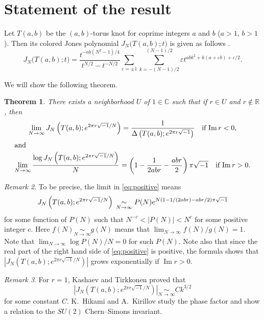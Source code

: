 \documentclass[a4paper,draft]{amsart}
\theoremstyle{plain}
\newtheorem{thm}{Theorem}[section]
\theoremstyle{definition}
\theoremstyle{remark}
\newtheorem{rem}[thm]{Remark}
\newcommand{\C}{\mathbb{C}}
\newcommand{\R}{\mathbb{R}}
\renewcommand{\Im}{\operatorname{Im}}
\numberwithin{equation}{section}
\begin{document}
\section{Statement of the result}
Let $T(a,b)$ be the $(a,b)$-torus knot for coprime integers $a$ and $b$
($a>1$, $b>1$).
Then its colored Jones polynomial $J_N\bigl(T(a,b);t\bigr)$ is given as follows
\cite{Morton:MATPC95}.
\begin{equation*}
  J_N\bigl(T(a,b);t\bigr)
  =
  \frac{t^{-ab(N^2-1)/4}}{t^{N/2}-t^{-N/2}}
  \sum_{\varepsilon=\pm1}
  \sum_{k=-(N-1)/2}^{(N-1)/2}
  \varepsilon
  t^{abk^2+k(a+\varepsilon{b})+\varepsilon/2}.
\end{equation*}
\par
We will show the following theorem.
\begin{thm}\label{thm}
There exists a neighborhood $U$ of $1\in\C$ such that
if $r\in{U}$ and $r\notin\R$, then
\begin{gather}
  \lim_{N\to\infty}J_N\left(T(a,b);e^{2\pi{r}\sqrt{-1}/N}\right)
  =
  \frac{1}{\Delta\left(T(a,b);e^{2\pi{r}\sqrt{-1}}\right)}
  \quad\text{if $\Im{r}<0$},
  \label{eq:negative}
  \\
  \intertext{and}
  \lim_{N\to\infty}
  \frac{\log{J_N\left(T(a,b);e^{2\pi{r}\sqrt{-1}/N}\right)}}{N}
  =
  \left(1-\dfrac{1}{2abr}-\dfrac{abr}{2}\right)\pi\sqrt{-1}
  \quad\text{if $\Im{r}>0$}.
  \label{eq:positive}
\end{gather}
\end{thm}
\begin{rem}
To be precise, the limit in \eqref{eq:positive} means
\begin{equation*}
  J_N\left(T(a,b);e^{2\pi{r}\sqrt{-1}/N}\right)
  \\
  \underset{N\to\infty}{\sim}
  P(N)e^{N(1-1/(2abr)-abr/2)\pi\sqrt{-1}}
\end{equation*}
for some function of $P(N)$ such that $N^{-c}<|P(N)|<N^c$ for some
positive integer $c$.
Here $f(N)\underset{N\to\infty}{\sim}g(N)$ means that
$\lim_{N\to\infty}f(N)/g(N)=1$.
Note that $\lim_{N\to\infty}\log{P(N)}/N=0$ for such $P(N)$.
Note also that since the real part of the right hand side of \eqref{eq:positive}
is positive, the formula shows that
$\left|J_N\left(T(a,b);e^{2\pi{r}\sqrt{-1}/N}\right)\right|$
grows exponentially if $\Im{r}>0$.
\end{rem}
\begin{rem}
For $r=1$,
Kashaev and Tirkkonen \cite{Kashaev/Tirkkonen:ZAPNS200} proved that
\begin{equation*}
  \left|J_N\left(T(a,b);e^{2\pi{r}\sqrt{-1}/N}\right)\right|
  \underset{N\to\infty}{\sim}
  Ck^{3/2}
\end{equation*}
for some constant $C$.
K.~Hikami and A.~Kirillov study the phase factor \cite{Hikami/Kirillov:PHYLB} and show a relation to the $SU(2)$ Chern--Simons invariant.
\end{rem}
\end{document}
